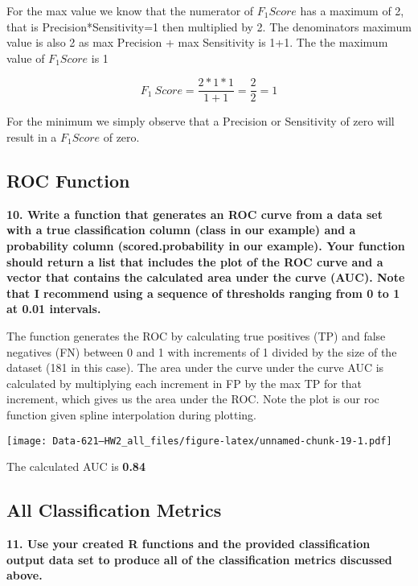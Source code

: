 \documentclass[]{article}
\begin{document}
For the max value we know that the numerator of \(F_{1}Score\) has a
maximum of 2, that is Precision*Sensitivity=1 then multiplied by 2. The
denominators maximum value is also 2 as max Precision + max Sensitivity
is 1+1. The the maximum value of \(F_{1}Score\) is 1

\[F_1\:Score = \frac {2 * 1 * 1}{1 + 1} = \frac{2}{2} = 1\]

For the minimum we simply observe that a Precision or Sensitivity of
zero will result in a \(F_{1}Score\) of zero.

\hypertarget{roc-function}{%
\subsection{ROC Function}\label{roc-function}}

\textbf{10. Write a function that generates an ROC curve from a data set
with a true classification column (class in our example) and a
probability column (scored.probability in our example). Your function
should return a list that includes the plot of the ROC curve and a
vector that contains the calculated area under the curve (AUC). Note
that I recommend using a sequence of thresholds ranging from 0 to 1 at
0.01 intervals. }

The function generates the ROC by calculating true positives (TP) and
false negatives (FN) between 0 and 1 with increments of 1 divided by the
size of the dataset (181 in this case). The area under the curve under
the curve AUC is calculated by multiplying each increment in FP by the
max TP for that increment, which gives us the area under the ROC. Note
the plot is our roc function given spline interpolation during plotting.

\texttt{[image: Data-621---HW2\_all\_files/figure-latex/unnamed-chunk-19-1.pdf]}

The calculated AUC is \textbf{0.84}

\hypertarget{all-classification-metrics}{%
\subsection{All Classification
Metrics}\label{all-classification-metrics}}

\textbf{11. Use your created R functions and the provided classification
output data set to produce all of the classification metrics discussed
above. }
\end{document}
